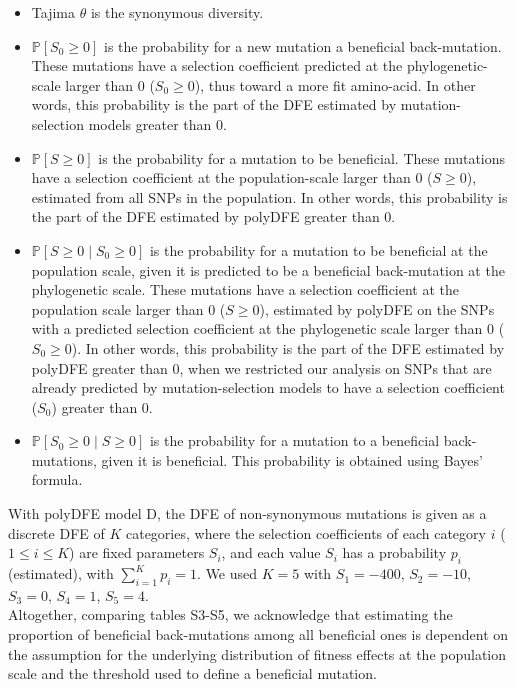 \documentclass{article}
\newcommand{\Sphy}{S_{0}}
\newcommand{\given}{\mid}
\newcommand{\Spop}{S}
\begin{document}
    \begin{itemize}
        \item Tajima $\theta$ is the synonymous diversity.
        \item $\mathbb{P} [ \Sphy \geq 0 ]$ is the probability for a new mutation a beneficial back-mutation.
        These mutations have a selection coefficient predicted at the phylogenetic-scale larger than 0 ($\Sphy \geq 0$), thus toward a more fit amino-acid.
        In other words, this probability is the part of the DFE estimated by mutation-selection models greater than 0.
        \item $\mathbb{P} [ \Spop \geq 0 ]$ is the probability for a mutation to be beneficial.
        These mutations have a selection coefficient at the population-scale larger than 0 ($\Spop \geq 0$), estimated from all SNPs in the population.
        In other words, this probability is the part of the DFE estimated by polyDFE greater than 0.
        \item $\mathbb{P} [ \Spop \geq 0 \given \Sphy \geq 0]$ is the probability for a mutation to be beneficial at the population scale, given it is predicted to be a beneficial back-mutation at the phylogenetic scale.
        These mutations have a selection coefficient at the population scale larger than 0 ($\Spop \geq 0$), estimated by polyDFE on the SNPs with a predicted selection coefficient at the phylogenetic scale larger than 0 ($\Sphy \geq 0$).
        In other words, this probability is the part of the DFE estimated by polyDFE greater than 0, when we restricted our analysis on SNPs that are already predicted by mutation-selection models to have a selection coefficient ($\Sphy$) greater than 0.
        \item $\mathbb{P} [ \Sphy \geq 0 \given \Spop \geq 0]$ is the probability for a mutation to a beneficial back-mutations, given it is beneficial.
        This probability is obtained using Bayes' formula.
    \end{itemize}
    With polyDFE model D, the DFE of non-synonymous mutations is given as a discrete DFE of $K$ categories, where the selection coefficients of each category $i$ ($1 \leq i \leq K$) are fixed parameters $\Spop_i$, and each value $\Spop_i$ has a probability $p_i$ (estimated), with $\sum_{i=1}^{K} p_i =1$.
    We used $K=5$ with $\Spop_1 = -400$, $\Spop_2 = -10$, $\Spop_3 = 0$, $\Spop_4 = 1$, $\Spop_5 = 4$.\\

    Altogether, comparing tables S3-S5, we acknowledge that estimating the proportion of beneficial back-mutations among all beneficial ones is dependent on the assumption for the underlying distribution of fitness effects at the population scale and the threshold used to define a beneficial mutation.
    \newpage
\end{document}
